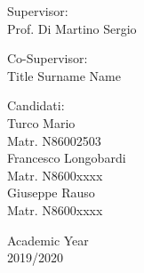 \begin{center}
\begin{multicols}{2}
	{\large Supervisor:\\}
	Prof. Di Martino Sergio\\
	\vspace{5mm}
	
	{\large Co-Supervisor:\\}
	Title Surname Name\\
	\vspace{5mm}
	
	{\large Candidati:\\}
	Turco Mario\\
	Matr. N86002503\\
	Francesco Longobardi\\
	Matr. N8600xxxx\\
	Giuseppe Rauso\\
	Matr. N8600xxxx
	\vspace{10mm}
\end{multicols}

\vfill

{\large Academic Year\\ 2019/2020}

\end{center}



%
%
\newpage
\openright

\tableofcontents

%
%


